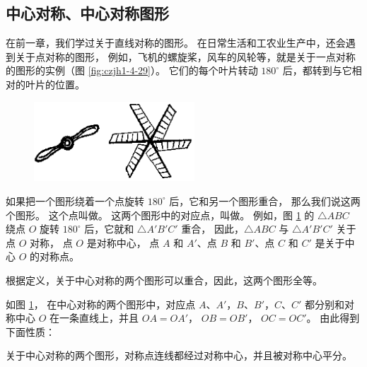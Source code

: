 \subsection{中心对称、中心对称图形}\label{subsec:czjh1-4-8}

在前一章，我们学过关于直线对称的图形。
在日常生活和工农业生产中，还会遇到关于点对称的图形，
例如，飞机的螺旋桨，风车的风轮等，就是关于一点对称的图形的实例（图 \ref{fig:czjh1-4-29}）。
它们的每个叶片转动 $180^\circ$ 后，都转到与它相对的叶片的位置。

\begin{figure}[htbp]
    \centering
    \begin{minipage}[b]{7cm}
        \centering
        \includegraphics[width=6cm]{../pic/czjh1-ch4-29.png}
        \caption{}\label{fig:czjh1-4-29}
    \end{minipage}
    \qquad
    \begin{minipage}[b]{7cm}
        \centering
        
        \caption{}\label{fig:czjh1-4-30}
    \end{minipage}
\end{figure}

如果把一个图形绕着一个点旋转 $180^\circ$ 后，它和另一个图形重合，
那么我们说这两个图形。
这个点叫做。
这两个图形中的对应点，叫做。
例如，图 \ref{fig:czjh1-4-30} 的 $\triangle ABC$ 绕点 $O$ 旋转 $180^\circ$ 后，它就和 $\triangle A'B'C'$ 重合，
因此，$\triangle ABC$ 与 $\triangle A'B'C'$ 关于点 $O$ 对称， 点 $O$ 是对称中心，
点 $A$ 和 $A'$、点 $B$ 和 $B'$、点 $C$ 和 $C'$ 是关于中心 $O$ 的对称点。

根据定义，关于中心对称的两个图形可以重合，因此，这两个图形全等。

如图 \ref{fig:czjh1-4-30}， 在中心对称的两个图形中，对应点 $A$、$A'$，$B$、$B'$，$C$、$C'$
都分别和对称中心 $O$ 在一条直线上，并且 $OA = OA'$， $OB = OB'$， $OC = OC'$。
由此得到下面性质：

\begin{xingzhi}[性质1]
    关于中心对称的两个图形，对称点连线都经过对称中心，并且被对称中心平分。
\end{xingzhi}

